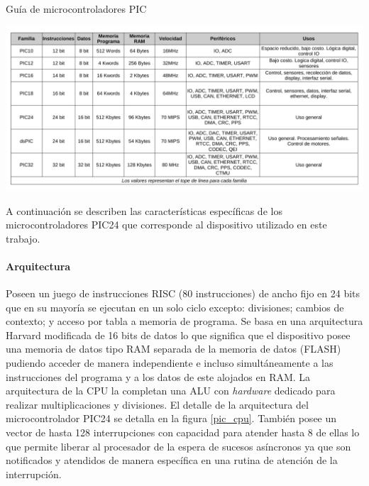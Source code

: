 \documentclass[11pt,letterpaper]{article}
\begin{document}
\begin{table}[ht!]
\caption{Guía de microcontroladores PIC}\label{pic_list}
\centering \includegraphics[width=\textwidth]{img/pic_list.pdf}
\end{table}

A continuación se describen las características específicas de los microcontroladores PIC24 que corresponde al dispositivo utilizado en este trabajo.

\paragraph{Arquitectura}
Poseen un juego de instrucciones \ac{RISC} (80 instrucciones) de ancho fijo en 24 bits que en su mayoría se ejecutan en un solo ciclo excepto: divisiones; cambios de contexto; y acceso por tabla a memoria de programa\cite{PIC24_PROG}. Se basa en una arquitectura Harvard modificada de 16 bits de datos\cite{PIC24F} lo que significa que el dispositivo posee una memoria de datos tipo \ac{RAM} separada de la memoria de datos (FLASH) pudiendo acceder de manera independiente e incluso simultáneamente a las instrucciones del programa y a los datos de este alojados en \ac{RAM}. La arquitectura de la CPU la completan una \ac{ALU} con \textit{hardware} dedicado para realizar multiplicaciones y divisiones. El detalle de la arquitectura del microcontrolador PIC24 se detalla en la figura \ref{pic_cpu}. También posee un vector de hasta 128 interrupciones con capacidad para atender hasta 8 de ellas lo que permite liberar al procesador de la espera de sucesos asíncronos ya que son notificados y atendidos de manera específica en una rutina de atención de la interrupción.
\end{document}
